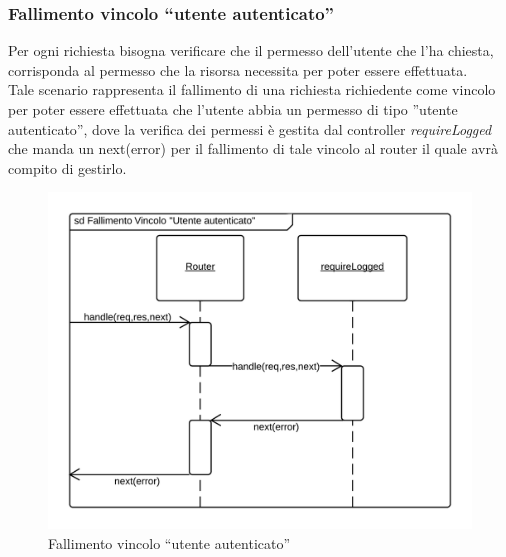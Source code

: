 \subsubsection{Fallimento vincolo ``utente autenticato''}
Per ogni richiesta bisogna verificare che il permesso dell'utente che l'ha chiesta, corrisponda al permesso che la risorsa necessita per poter essere effettuata. \\
Tale scenario rappresenta il fallimento di una richiesta richiedente come vincolo per poter essere effettuata che l'utente abbia un permesso di tipo ''utente autenticato'', dove la verifica dei permessi è gestita dal controller \emph{requireLogged} che manda un next(error) per il fallimento di tale vincolo al router il quale avrà compito di gestirlo.
\begin{figure}[H]
	\begin{center} 
		\includegraphics[scale=0.20]{scenari/requireLogged ERROR.png} 
		\caption{Fallimento vincolo ``utente autenticato''}
	\end{center} 
\end{figure}

\pagebreak
